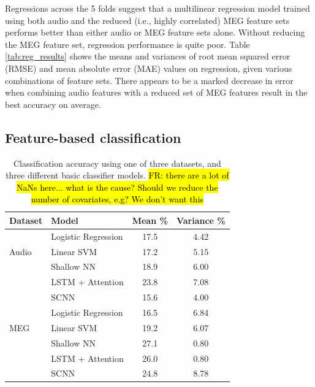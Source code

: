 \documentclass[utf8]{frontiersSCNS} %
\newcommand{\FR}[1]{{\small \textcolor{red}{\hl{FR: #1}}}}
\begin{document}
Regressions across the 5 folds suggest that a multilinear regression model trained using both audio and the reduced (i.e., highly correlated) MEG feature sets performs better than either audio or MEG feature sets alone. Without reducing the MEG feature set, regression performance is quite poor. Table \ref{tab:reg_results} shows the means and variances of root mean squared error (RMSE) and mean absolute error (MAE) values on regression, given various combinations of feature sets. There appears to be a marked decrease in error when combining audio features with a reduced set of MEG features result in the best accuracy on average.



\subsection{Feature-based classification}

\begin{table}[t]
  \centering
  \label{tab:feat_results}
  \begin{tabular}{l l | c | c}
    \toprule
    \textbf{Dataset} & \textbf{Model} & \textbf{Mean \%} & \textbf{Variance \%} \\
    \toprule
    \multirow{3}{*}{Audio}
                     & Logistic Regression & 17.5 & 4.42  \\
                     & Linear SVM          & 17.2 & 5.15  \\
                     & Shallow NN          & 18.9 & 6.00  \\
                     & LSTM + Attention    & 23.8 & 7.08  \\
                     & SCNN                & 15.6 & 4.00  \\
    \midrule
    \multirow{3}{*}{MEG}
                     & Logistic Regression & 16.5 & 6.84  \\
                     & Linear SVM          & 19.2 & 6.07  \\
                     & Shallow NN          & 27.1 & 0.80  \\
                     & LSTM + Attention    & 26.0 & 0.80  \\
                     & SCNN                & 24.8 & 8.78  \\
    \bottomrule
  \end{tabular}
  \caption{Classification accuracy using one of three datasets, and three different basic classifier models. \FR{there are a lot of NaNs here... what is the cause? Should we reduce the number of covariates, e.g? We don't want this}}
\end{table}
\end{document}
